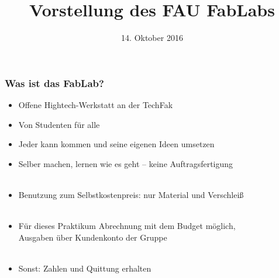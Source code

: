 \documentclass[t]{beamer}
\begin{document}


\date{14. Oktober 2016}
\title[Vorstellung]{Vorstellung des FAU FabLabs}
\author{} %
\frame[plain,c]{\titlepage} %




\begin{frame}
    \frametitle{Was ist das FabLab?}
    \begin{itemize}
        \item Offene Hightech-Werkstatt an der TechFak
        \item Von Studenten für alle
        \item Jeder kann kommen und seine eigenen Ideen umsetzen
        \item Selber machen, lernen wie es geht -- keine Auftragsfertigung\\~
        \item Benutzung zum Selbstkostenpreis: nur Material und Verschleiß\\~
        \item Für dieses Praktikum Abrechnung mit dem Budget möglich,\\
        Ausgaben über Kundenkonto der Gruppe\\~
        \item Sonst: Zahlen und Quittung erhalten
    \end{itemize}

\end{frame}

%
%
\end{document}
